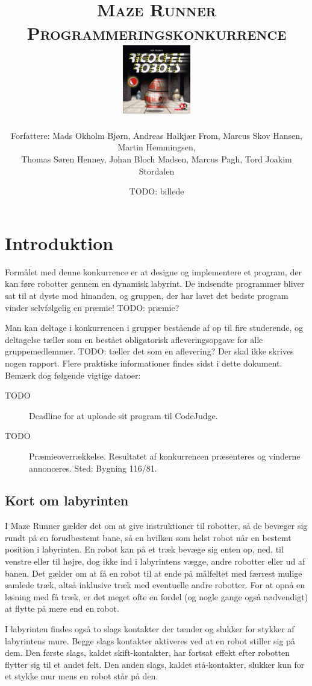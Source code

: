 \documentclass[10pt, a4paper]{article}
\title{\textsc{\Huge Maze Runner}\\\textsc{Programmeringskonkurrence}\\[0.25cm]\includegraphics[height=3cm]{img/boxart.jpg}}
\date{TODO: billede}
\author{{\small Forfattere:
    Mads Okholm Bjørn,
    Andreas Halkjær From,
    Marcus Skov Hansen,
    Martin Hemmingsen,
  }\\{\small
    Thomas Søren Henney,
    Johan Bloch Madsen,
    Marcus Pagh,
    Tord Joakim Stordalen
}}
\begin{document}
\maketitle

\section{Introduktion}
Formålet med denne konkurrence er at designe og implementere et program, der kan føre robotter gennem en dynamisk labyrint.
De indsendte programmer bliver sat til at dyste mod hinanden, og gruppen, der har lavet det bedste program vinder selvfølgelig en præmie! TODO: præmie?

Man kan deltage i konkurrencen i grupper bestående af op til fire studerende, og deltagelse tæller som en bestået obligatorisk afleveringsopgave for alle gruppemedlemmer. TODO: tæller det som en aflevering?
Der skal ikke skrives nogen rapport.
Flere praktiske informationer findes sidst i dette dokument.
Bemærk dog følgende vigtige datoer:

\begin{description}
\item [TODO] Deadline for at uploade sit program til CodeJudge.
\item [TODO] Præmieoverrækkelse. Resultatet af konkurrencen præsenteres og vinderne annonceres. Sted: Bygning 116/81.
\end{description}

\subsection{Kort om labyrinten}
I Maze Runner gælder det om at give instruktioner til robotter, så de bevæger sig rundt på en forudbestemt bane, så en hvilken som helst robot når en bestemt position i labyrinten.
En robot kan på et træk bevæge sig enten op, ned, til venstre eller til højre, dog ikke ind i labyrintens vægge, andre robotter eller ud af banen.
Det gælder om at få en robot til at ende på målfeltet med færrest mulige samlede træk, altså inklusive træk med eventuelle andre robotter.
For at opnå en løsning med få træk, er det meget ofte en fordel (og nogle gange også nødvendigt) at flytte på mere end en robot.

I labyrinten findes også to slags kontakter der tænder og slukker for stykker af labyrintens mure.
Begge slags kontakter aktiveres ved at en robot stiller sig på dem.
Den første slags, kaldet skift-kontakter, har fortsat effekt efter robotten flytter sig til et andet felt.
Den anden slags, kaldet stå-kontakter, slukker kun for et stykke mur mens en robot står på den.
\end{document}
